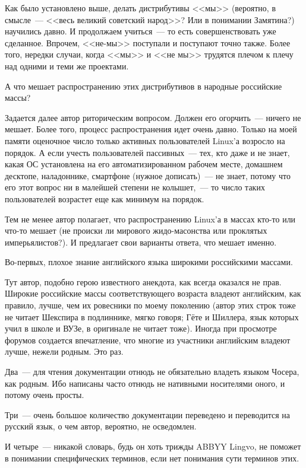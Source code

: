 Как было установлено выше, делать дистрибутивы <<мы>> (вероятно, в смысле~--- <<весь великий советский народ>>? Или в понимании Замятина?) научились давно. И продолжаем учиться~--- то есть совершенствовать уже сделанное. Впрочем, <<не-мы>> поступали и поступают точно также. Более того, нередки случаи, когда <<мы>> и <<не мы>> трудятся плечом к плечу над одними и теми же проектами. 
\begin{shadequote}{}
А что мешает распространению этих дистрибутивов в народные российские массы?
\end{shadequote}

Задается далее автор риторическим вопросом. Должен его огорчить~--- ничего не мешает. Более того, процесс распространения идет очень давно. Только на моей памяти оценочное число только активных пользователей Linux'а возросло на порядок. А если учесть пользователей пассивных~--- тех, кто даже и не знает, какая ОС установлена на его автоматизированном рабочем месте, домашнем десктопе, наладоннике, смартфоне (нужное дописать)~--- не знает, потому что его этот вопрос ни в малейшей степени не колышет,~--- то число таких пользователей возрастет еще как минимум на порядок. 

Тем не менее автор полагает, что распространению Linux'а в массах кто-то или что-то мешает (не происки ли мирового жидо-масонства или проклятых имперьялистов?). И предлагает свои варианты ответа, что мешает именно. 
\begin{shadequote}{}
Во-первых, плохое знание английского языка широкими российскими массами.
\end{shadequote}
Тут автор, подобно герою известного анекдота, как всегда оказался не прав. Широкие российские массы соответствующего возраста владеют английским, как правило, лучше, чем их ровесники по моему поколению (автор этих строк тоже не читает Шекспира в подлиннике, мягко говоря; Гёте и Шиллера, язык которых учил в школе и ВУЗе, в оригинале не читает тоже). Иногда при просмотре форумов создается впечатление, что многие из участники английским владеют лучше, нежели родным. Это раз. 

Два~--- для чтения документации отнюдь не обязательно владеть языком Чосера, как родным. Ибо написаны часто отнюдь не нативными носителями оного, и потому очень просты. 

Три~--- очень большое количество документации переведено и переводится на русский язык, о чем автор, вероятно, не осведомлен. 

И четыре~--- никакой словарь, будь он хоть трижды ABBYY Lingvo, не поможет в понимании специфических терминов, если нет понимания сути терминов этих. 

